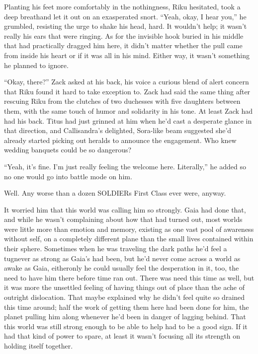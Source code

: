 

Planting his feet more comfortably in the nothingness, Riku hesitated, took a deep breath\textemdash and let it out on an exasperated snort. ``Yeah, okay, I hear you,'' he grumbled, resisting the urge to shake his head, hard. It wouldn't help; it wasn't really his ears that were ringing. As for the invisible hook buried in his middle that had practically dragged him here, it didn't matter whether the pull came from inside his heart or if it was all in his mind. Either way, it wasn't something he planned to ignore.

``Okay, there?'' Zack asked at his back, his voice a curious blend of alert concern that Riku found it hard to take exception to. Zack had said the same thing after rescuing Riku from the clutches of two duchesses with five daughters between them, with the same touch of humor and solidarity in his tone. At least Zack had had his back. Titus had just grinned at him when he'd cast a desperate glance in that direction, and Callisandra's delighted, Sora-like beam suggested she'd already started picking out heralds to announce the engagement. Who knew wedding banquets could be so dangerous?

``Yeah, it's fine. I'm just really feeling the welcome here. Literally,'' he added so no one would go into battle mode on him.

Well. Any worse than a dozen SOLDIERs First Class ever were, anyway.

It worried him that this world was calling him so strongly. Gaia had done that, and while he wasn't complaining about how that had turned out, most worlds were little more than emotion and memory, existing as one vast pool of awareness without self, on a completely different plane than the small lives contained within their sphere. Sometimes when he was traveling the dark paths he'd feel a tug\textemdash never as strong as Gaia's had been, but he'd never come across a world as awake as Gaia, either\textemdash only he could usually feel the desperation in it, too, the need to have him there before time ran out. There was need this time as well, but it was more the unsettled feeling of having things out of place than the ache of outright dislocation. That maybe explained why he didn't feel quite so drained this time around; half the work of getting them here had been done for him, the planet pulling him along whenever he'd been in danger of lagging behind. That this world was still strong enough to be able to help had to be a good sign. If it had that kind of power to spare, at least it wasn't focusing all its strength on holding itself together.

